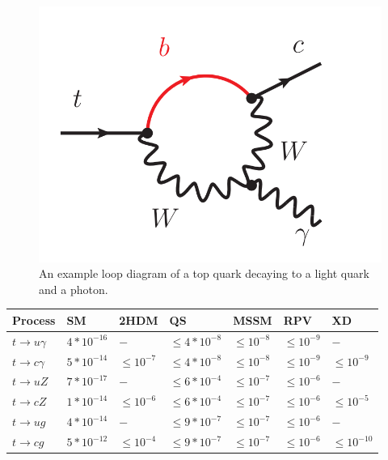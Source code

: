 \begin{figure}[h!]
	\centering
	\includegraphics[width=.5\columnwidth]{../ThesisImages/Theory/FCNCLoop.png}
	\caption{An example loop diagram of a top quark decaying to a light quark and a photon.}
	\label{fig:FCNCLoop}
\end{figure}


\begin{table}[]
\begin{center}
\begin{tabular}{lllllll}
 \hhline{=======}
Process                                    & SM                        & 2HDM                   & QS                           & MSSM                   & RPV                          & XD                                 \\   \hline 
$t\rightarrow u\gamma $ &    $ 4*10^{-16} $        & $ -  $                   & $ \leq 4*10^{-8} $   & $ \leq 10^{-8} $ & $ \leq 10^{-9} $      &  $- $                                             \\
$t\rightarrow c\gamma $ &    $ 5*10^{-14} $        & $ \leq 10^{-7}   $ & $ \leq 4*10^{-8} $ & $ \leq 10^{-8} $ & $ \leq 10^{-9} $     & $ \leq 10^{-9}  $\\ \hline
$t\rightarrow u Z                    $ & $ 7*10^{-17} $  & $ -                     $ & $ \leq 6*10^{-4} $ & $ \leq 10^{-7} $ & $ \leq 10^{-6} $     & $ -  $                                             \\
$t\rightarrow c Z                    $ & $ 1*10^{-14} $  & $ \leq 10^{-6}   $ & $ \leq 6*10^{-4} $ & $ \leq 10^{-7} $ & $ \leq 10^{-6} $     & $ \leq 10^{-5} $ \\
$t\rightarrow u g                    $ & $ 4*10^{-14} $  & $ -                     $ & $ \leq 9*10^{-7} $ & $ \leq 10^{-7} $ & $ \leq 10^{-6} $     & $ -  $                                             \\
$t\rightarrow c g                    $ & $ 5*10^{-12} $  & $ \leq 10^{-4}   $  & $ \leq 9*10^{-7} $ & $ \leq 10^{-7} $ & $ \leq 10^{-6} $    & $ \leq 10^{-10} $ \\

\end{tabular}
\end{center}
\end{table}
